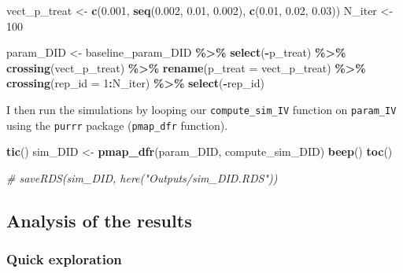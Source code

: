 \documentclass[
]{article}
\newenvironment{Shaded}{\begin{snugshade}}{\end{snugshade}}
\newcommand{\AttributeTok}[1]{\textcolor[rgb]{0.13,0.29,0.53}{#1}}
\newcommand{\CommentTok}[1]{\textcolor[rgb]{0.56,0.35,0.01}{\textit{#1}}}
\newcommand{\DecValTok}[1]{\textcolor[rgb]{0.00,0.00,0.81}{#1}}
\newcommand{\FloatTok}[1]{\textcolor[rgb]{0.00,0.00,0.81}{#1}}
\newcommand{\FunctionTok}[1]{\textcolor[rgb]{0.13,0.29,0.53}{\textbf{#1}}}
\newcommand{\NormalTok}[1]{#1}
\newcommand{\OtherTok}[1]{\textcolor[rgb]{0.56,0.35,0.01}{#1}}
\newcommand{\SpecialCharTok}[1]{\textcolor[rgb]{0.81,0.36,0.00}{\textbf{#1}}}
\begin{document}
\begin{Shaded}
\begin{Highlighting}[]
\NormalTok{vect\_p\_treat }\OtherTok{\textless{}{-}} \FunctionTok{c}\NormalTok{(}\FloatTok{0.001}\NormalTok{, }\FunctionTok{seq}\NormalTok{(}\FloatTok{0.002}\NormalTok{, }\FloatTok{0.01}\NormalTok{, }\FloatTok{0.002}\NormalTok{), }\FunctionTok{c}\NormalTok{(}\FloatTok{0.01}\NormalTok{, }\FloatTok{0.02}\NormalTok{, }\FloatTok{0.03}\NormalTok{))}
\NormalTok{N\_iter }\OtherTok{\textless{}{-}} \DecValTok{100}

\NormalTok{param\_DID }\OtherTok{\textless{}{-}}\NormalTok{ baseline\_param\_DID }\SpecialCharTok{\%\textgreater{}\%} 
  \FunctionTok{select}\NormalTok{(}\SpecialCharTok{{-}}\NormalTok{p\_treat) }\SpecialCharTok{\%\textgreater{}\%} 
  \FunctionTok{crossing}\NormalTok{(vect\_p\_treat) }\SpecialCharTok{\%\textgreater{}\%} 
  \FunctionTok{rename}\NormalTok{(}\AttributeTok{p\_treat =}\NormalTok{ vect\_p\_treat) }\SpecialCharTok{\%\textgreater{}\%} 
  \FunctionTok{crossing}\NormalTok{(}\AttributeTok{rep\_id =} \DecValTok{1}\SpecialCharTok{:}\NormalTok{N\_iter) }\SpecialCharTok{\%\textgreater{}\%} 
  \FunctionTok{select}\NormalTok{(}\SpecialCharTok{{-}}\NormalTok{rep\_id)}
\end{Highlighting}
\end{Shaded}

I then run the simulations by looping our \texttt{compute\_sim\_IV}
function on \texttt{param\_IV} using the \texttt{purrr} package
(\texttt{pmap\_dfr} function).

\begin{Shaded}
\begin{Highlighting}[]
\FunctionTok{tic}\NormalTok{()}
\NormalTok{sim\_DID }\OtherTok{\textless{}{-}} \FunctionTok{pmap\_dfr}\NormalTok{(param\_DID, compute\_sim\_DID)}
\FunctionTok{beep}\NormalTok{()}
\FunctionTok{toc}\NormalTok{()}

\CommentTok{\# saveRDS(sim\_DID, here("Outputs/sim\_DID.RDS"))}
\end{Highlighting}
\end{Shaded}

\hypertarget{analysis-of-the-results}{%
\subsection{Analysis of the results}\label{analysis-of-the-results}}

\hypertarget{quick-exploration}{%
\subsubsection{Quick exploration}\label{quick-exploration}}
\end{document}
